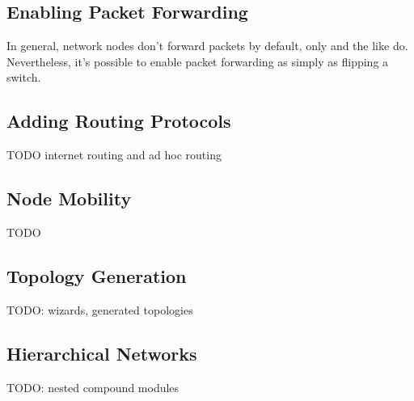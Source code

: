 
\subsection{Enabling Packet Forwarding}

In general, network nodes don't forward packets by default, only
 and the like do. Nevertheless, it's possible to enable
packet forwarding as simply as flipping a switch.


\subsection{Adding Routing Protocols}

TODO internet routing and ad hoc routing

\subsection{Node Mobility}

TODO

\subsection{Topology Generation}

TODO: wizards, generated topologies

\subsection{Hierarchical Networks}

TODO: nested compound modules



